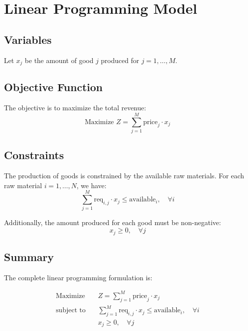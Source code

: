 \documentclass{article}
\begin{document}
\section*{Linear Programming Model}

\subsection*{Variables}
Let \( x_j \) be the amount of good \( j \) produced for \( j = 1, \ldots, M \).

\subsection*{Objective Function}
The objective is to maximize the total revenue:
\[
\text{Maximize } Z = \sum_{j=1}^{M} \text{price}_j \cdot x_j
\]

\subsection*{Constraints}
The production of goods is constrained by the available raw materials. For each raw material \( i = 1, \ldots, N \), we have:
\[
\sum_{j=1}^{M} \text{req}_{i,j} \cdot x_j \leq \text{available}_i, \quad \forall i
\]

Additionally, the amount produced for each good must be non-negative:
\[
x_j \geq 0, \quad \forall j
\]

\subsection*{Summary}
The complete linear programming formulation is:

\[
\begin{align*}
\text{Maximize} & \quad Z = \sum_{j=1}^{M} \text{price}_j \cdot x_j \\
\text{subject to} & \quad \sum_{j=1}^{M} \text{req}_{i,j} \cdot x_j \leq \text{available}_i, \quad \forall i \\
& \quad x_j \geq 0, \quad \forall j
\end{align*}
\]
\end{document}
